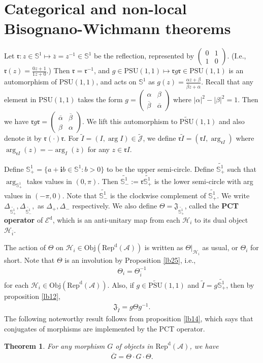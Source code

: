\documentclass[12pt,a4paper]{article}
\theoremstyle{definition}
\theoremstyle{plain}
\newtheorem{thm}[df]{Theorem}
\newcommand{\fk}{\mathfrak}
\newcommand{\mc}{\mathcal}
\newcommand{\wtd}{\widetilde}
\newcommand{\ovl}{\overline}
\newcommand{\PSU}{\mathrm{PSU}(1,1)}
\newcommand{\UPSU}{\widetilde{\mathrm{PSU}}(1,1)}
\newcommand{\Jtd}{\widetilde{\mathcal J}}
\newcommand{\im}{\mathbf{i}}
\newcommand{\RepdA}{\mathrm{Rep}^{\mathrm d}(\mc A)}
\newcommand{\mbb}{\mathbb}
\newcommand{\Obj}{\mathrm{Obj}}
\newcommand{\Ed}{\mathscr E^{\mathrm d}}
\numberwithin{equation}{section}
\begin{document}
\section{Categorical and non-local Bisognano-Wichmann theorems}\label{lb22}

Let $\fk r:z\in \mbb S^1\mapsto \ovl z=z^{-1}\in\mbb S^1$ be the reflection, represented by $\left( \begin{array}{cc}
0& 1 \\
1 &0
\end{array} \right)$. (I.e., $\fk r(z)=\frac {0z+1}{1z+0}$.) Then $\fk r=\fk r^{-1}$, and $g\in\PSU\mapsto \fk rg\fk r\in\PSU$ is an automorphism of $\PSU$, and acts on $\mbb S^1$ as $g(z)=\frac{\alpha z+\beta}{\ovl\beta z+\ovl\alpha}$. Recall that any element in $\PSU$ takes the form $g=\left( \begin{array}{cc}
\alpha  & \beta \\
\ovl\beta &\ovl\alpha
\end{array} \right)$ where $|\alpha|^2-|\beta|^2=1$. Then we have $\fk rg\fk r=\left( \begin{array}{cc}
\ovl\alpha  &\ovl \beta \\
\beta &\alpha
\end{array} \right)$. We lift this automorphism to $\UPSU$ and also denote it by $\fk r(\cdot)\fk r$. For $\wtd I=(I,\arg I)\in\Jtd$, we define $\fk r\wtd I=(\fk rI,\arg_{\fk rI})$ where $\arg_{\fk rI}(z)=-\arg_I(\ovl z)$ for any $z\in \fk rI$.

Define $\mbb S^1_+=\{a+\im b\in\mbb S^1:b>0\}$ to  be the upper semi-circle. Define $\wtd{\mbb S^1_+}$ such that $\arg_{\mbb S^1_+}$ takes values in $(0,\pi)$. Then $\wtd{\mbb S^1_-}:=\fk r\wtd{\mbb S^1_+}$ is the lower semi-circle with arg values in $(-\pi,0)$. Note that $\wtd{\mbb S^1_-}$ is the clockwise complement of $\wtd{\mbb S^1_+}$. We write $\Delta_{\wtd{\mbb S^1_+}},\Delta_{\wtd{\mbb S^1_-}},$ as $\Delta_+,\Delta_-$ respectively. We also define $\Theta=\fk J_{\wtd{\mbb S^1_+}}$, called the  \textbf{PCT operator} of $\Ed$, which is an anti-unitary map from each $\mc H_i$ to its dual object $\mc H_{\ovl i}$.  

The action of $\Theta$ on $\mc H_i\in\Obj(\RepdA)$ is written as $\Theta|_{\mc H_i}$ as usual, or $\Theta_i$ for short. Note that $\Theta$ is an involution by Proposition \ref{lb25}, i.e.,
\begin{align*}
\Theta_i=\Theta_{\ovl i}^{-1}	
\end{align*}
for each $\mc H_i\in\Obj(\RepdA)$. Also, if $g\in\UPSU$ and $\wtd I=g\wtd{\mbb S^1_+}$, then by proposition \ref{lb12},
\begin{align}
\fk J_{\wtd I}=g\Theta g^{-1}.
\end{align}
The following noteworthy result follows from proposition \ref{lb14}, which says that conjugates of morphisms are implemented by the PCT operator.
\begin{thm}
For any morphism $G$ of objects in $\RepdA$, we have
\begin{align*}
\ovl G=\Theta\cdot G\cdot\Theta.
\end{align*}
\end{thm}
\end{document}
